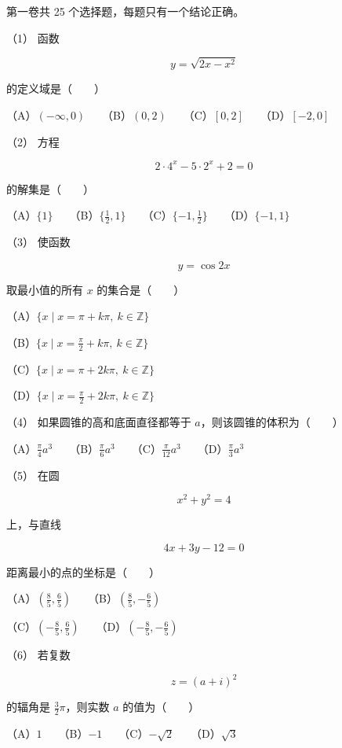 \begin{question}

第一卷共 25 个选择题，每题只有一个结论正确。

（1） 函数

\nopagebreak[4]
\[
y=\sqrt{2x-x^2}
\]

的定义域是\mbox{（　　）}

（A）$(-\infty,0)$　　（B）$(0,2)$　　（C）$[0,2]$　　（D）$[-2,0]$

（2） 方程

\nopagebreak[4]
\[
2\cdot4^x-5\cdot2^x+2=0
\]

的解集是\mbox{（　　）}

（A）$\{1\}$　　（B）$\{\frac12,1\}$　　（C）$\{-1,\frac12\}$　　（D）$\{-1,1\}$

（3） 使函数

\nopagebreak[4]
\[
y=\cos2x
\]

取最小值的所有 $x$ 的集合是\mbox{（　　）}

（A）$\{x\mid x=\pi+k\pi,\ k\in\mathbb Z\}$

（B）$\{x\mid x=\frac\pi2+k\pi,\ k\in\mathbb Z\}$

（C）$\{x\mid x=\pi+2k\pi,\ k\in\mathbb Z\}$

（D）$\{x\mid x=\frac\pi2+2k\pi,\ k\in\mathbb Z\}$

（4） 如果圆锥的高和底面直径都等于 $a$，则该圆锥的体积为\mbox{（　　）}

（A）$\frac\pi4a^3$　　（B）$\frac\pi6a^3$　　（C）$\frac\pi{12}a^3$　　（D）$\frac\pi3a^3$

（5） 在圆

\nopagebreak[4]
\[
x^2+y^2=4
\]

上，与直线

\nopagebreak[4]
\[
4x+3y-12=0
\]

距离最小的点的坐标是\mbox{（　　）}

（A）$\left(\frac85,\frac65\right)$　　（B）$\left(\frac85,-\frac65\right)$

（C）$\left(-\frac85,\frac65\right)$　　（D）$\left(-\frac85,-\frac65\right)$

（6） 若复数

\nopagebreak[4]
\[
z=(a+i)^2
\]

的辐角是 $\frac32\pi$，则实数 $a$ 的值为\mbox{（　　）}

（A）$1$　　（B）$-1$　　（C）$-\sqrt2$　　（D）$\sqrt3$


\end{question}
